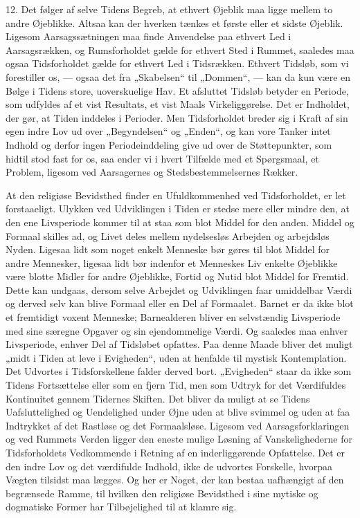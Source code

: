 \documentclass[12pt,a4paper,openany]{book}
\newcommand{\opage}[1]{\marginnote{\footnotesize\textit{[#1]}}}
\begin{document}
12. Det følger af selve Tidens Begreb, at ethvert Øjeblik maa ligge
mellem to andre Øjeblikke. Altsaa kan der hverken tænkes et første eller
et sidste Øjeblik. Ligesom Aarsagssætningen maa finde Anvendelse paa
ethvert Led i Aarsagsrækken, og Rumsforholdet gælde for ethvert Sted i
Rummet, saaledes maa ogsaa Tidsforholdet gælde for ethvert Led i
Tidsrækken. Ethvert Tidsløb, som vi forestiller os, --- ogsaa det fra
„Skabelsen“ til „Dommen“, ---
\opage{33}kan da kun være en Bølge i Tidens store, uoverskuelige Hav. Et
afsluttet Tidsløb betyder en Periode, som udfyldes af et vist Resultats,
et vist Maals Virkeliggørelse. Det er Indholdet, der gør, at Tiden
inddeles i Perioder. Men Tidsforholdet breder sig i Kraft af sin egen
indre Lov ud over „Begyndelsen“ og „Enden“, og kan vore Tanker intet
Indhold og derfor ingen Periodeinddeling give ud over de Støttepunkter,
som hidtil stod fast for os, saa ender vi i hvert Tilfælde med et
Spørgsmaal, et Problem, ligesom ved Aarsagernes og Stedsbestemmelsernes
Rækker.

At den religiøse Bevidsthed finder en Ufuldkommenhed ved Tidsforholdet,
er let forstaaeligt. Ulykken ved Udviklingen i Tiden er stedse mere
eller mindre den, at den ene Livsperiode kommer til at staa som blot
Middel for den anden. Middel og Formaal skilles ad, og Livet deles
mellem nydelsesløs Arbejden og arbejdsløs Nyden. Ligesaa lidt som noget
enkelt Menneske bør gøres til blot Middel for andre Mennesker, ligesaa
lidt bør indenfor et Menneskes Liv enkelte Øjeblikke være blotte Midler
for andre Øjeblikke, Fortid og Nutid blot Middel for Fremtid. Dette kan
undgaas, dersom selve Arbejdet og Udviklingen faar umiddelbar Værdi og
derved selv kan blive Formaal eller en Del af Formaalet. Barnet er da
ikke blot et fremtidigt voxent Menneske; Barnealderen bliver en
selvstændig Livsperiode med sine særegne Opgaver og sin ejendommelige
Værdi. Og saaledes maa enhver Livsperiode, enhver Del af Tidsløbet
opfattes. Paa denne Maade bliver det muligt „midt i Tiden at leve i
Evigheden“, uden at henfalde til mystisk Kontemplation. Det Udvortes i
Tidsforskellene falder derved bort. „Evigheden“ staar da ikke som Tidens
Fortsættelse eller som en fjern Tid, men som Udtryk for det Værdifuldes
Kontinuitet gennem Tidernes Skiften. Det bliver da muligt at se Tidens
Uafsluttelighed og Uendelighed under Øjne uden at blive svimmel og uden
at faa Indtrykket af det Rastløse og det Formaalsløse. Ligesom ved
Aarsagsforklaringen og ved Rummets Verden ligger den eneste mulige
Løsning af Vanskelighederne for Tidsforholdets Vedkommende i Retning af
en inderliggørende Opfattelse. Det er den indre Lov og det værdifulde
Indhold, ikke de udvortes Forskelle, hvorpaa Vægten tilsidst maa lægges.
Og her er Noget, der kan bestaa uafhængigt af den begrænsede Ramme, til
hvilken den religiøse Bevidsthed i sine mytiske og dogmatiske Former har
Tilbøjelighed til at klamre sig.
\end{document}
